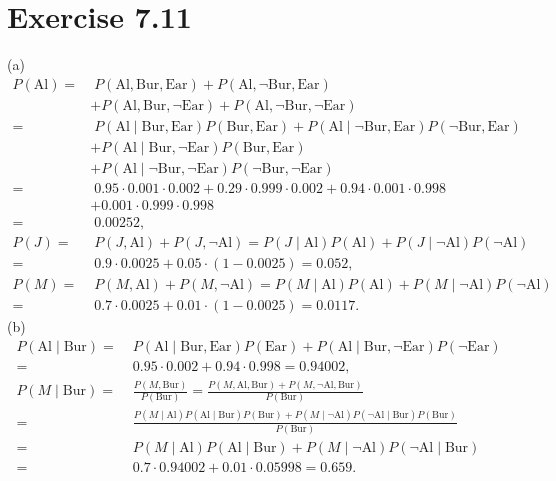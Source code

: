 \documentclass[10pt]{book}
\begin{document}
\section{Exercise 7.11}
(a)
\[
\begin{aligned}
P(\text{Al})= & \;P(\text{Al}, \text{Bur}, \text{Ear})+P(\text{Al}, \neg \text{Bur}, \text{Ear}) \\
& +P(\text{Al}, \text{Bur}, \neg \text{Ear})+P(\text{Al}, \neg \text{Bur}, \neg \text{Ear}) \\
= & \;P(\text{Al} \mid \text{Bur}, \text{Ear}) P(\text{Bur}, \text{Ear})+P(\text{Al} \mid \neg \text{Bur}, \text{Ear}) P(\neg \text{Bur}, \text{Ear}) \\
& +P(\text{Al} \mid \text{Bur}, \neg \text{Ear}) P(\text{Bur}, \text{Ear}) \\
& +P(\text{Al} \mid \neg \text{Bur}, \neg \text{Ear}) P(\neg \text{Bur}, \neg \text{Ear}) \\
= & \;0.95 \cdot 0.001 \cdot 0.002+0.29 \cdot 0.999 \cdot 0.002+0.94 \cdot 0.001 \cdot 0.998 \\
& +0.001 \cdot 0.999 \cdot 0.998 \\
= & \;0.00252, \\
P(J)= & \;P(J, \text{Al})+P(J, \neg \text{Al})=P(J \mid \text{Al}) P(\text{Al})+P(J \mid \neg \text{Al}) P(\neg \text{Al}) \\
= & \;0.9 \cdot 0.0025+0.05 \cdot(1-0.0025)=0.052, \\
P(M)= & \;P(M, \text{Al})+P(M, \neg \text{Al})=P(M \mid \text{Al}) P(\text{Al})+P(M \mid \neg \text{Al}) P(\neg \text{Al}) \\
= & \;0.7 \cdot 0.0025+0.01 \cdot(1-0.0025)=0.0117 .
\end{aligned}
\]
(b)
\[
\begin{aligned}
P(\text{Al} \mid \text{Bur})= & \;P(\text{Al} \mid \text{Bur}, \text{Ear}) P(\text{Ear})+P(\text{Al} \mid \text{Bur}, \neg \text{Ear}) P(\neg \text{Ear}) \\
= & \;0.95 \cdot 0.002+0.94 \cdot 0.998=0.94002, \\
P(M \mid \text{Bur})= & \;\frac{P(M, \text{Bur})}{P(\text{Bur})}=\frac{P(M, \text{Al}, \text{Bur})+P(M, \neg \text{Al}, \text{Bur})}{P(\text{Bur})} \\
= & \;\frac{P(M \mid \text{Al}) P(\text{Al} \mid \text{Bur}) P(\text{Bur})+P(M \mid \neg \text{Al}) P(\neg \text{Al} \mid \text{Bur}) P(\text{Bur})}{P(\text{Bur})} \\
= & \;P(M \mid \text{Al}) P(\text{Al} \mid \text{Bur})+P(M \mid \neg \text{Al}) P(\neg \text{Al} \mid \text{Bur}) \\
= & \;0.7 \cdot 0.94002+0.01 \cdot 0.05998=0.659 .
\end{aligned}
\]
\end{document}
